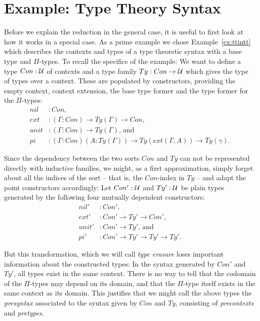 \section{Example: Type Theory Syntax}\label{sec:red-ex}

Before we explain the reduction in the general case, it is useful to first
look at how it works in a special case.
As a prime example we chose Example~\ref{ex:ttintt} which describes
the contexts and types of a type theoretic syntax with a base type and $\Pi$-types.
To recall the specifics of the example: We want to define a type
$Con : \mathcal{U}$ of contexts and a type family $Ty : Con \to \mathcal{U}$ which gives the
type of types over a context.
These are populated by constructors, providing the empty context,
context extension, the base type former and the type former for the $\Pi$-types:
\begin{align*}
nil &: Con \text{,} \\
ext &: (\Gamma : Con) \to Ty(\Gamma) \to Con \text{,} \\
unit &: (\Gamma : Con) \to Ty(\Gamma) \text{, and} \\
pi &: (\Gamma : Con) (A : Ty(\Gamma)) \to Ty(ext(\Gamma, A)) \to Ty(\gamma) \text{.}
\end{align*}

Since the dependency between the two sorts $Con$ and $Ty$ can not be represented
directly with inductive families, we might, as a first approximation, simply forget
about all the indices of the sort -- that is, the $Con$-index in $Ty$ --
and adapt the point constructors accordingly:
Let $Con' : \mathcal{U}$ and $Ty' : \mathcal{U}$ be plain types generated by the following four
mutually dependent constructors:
\begin{align*}
nil' &: Con' \text{,} \\
ext' &: Con' \to Ty' \to Con' \text{,} \\
unit' &: Con' \to Ty' \text{, and} \\
pi' &: Con' \to Ty' \to Ty' \to Ty' \text{.}
\end{align*}

But this transformation, which we will call \emph{type erasure} loses important
information about the constructed types:
In the syntax generated by $Con'$ and $Ty'$, all types exist in the same context.
There is no way to tell that the codomain of the $\Pi$-types may depend on its domain,
and that the $\Pi$-type itself exists in the same context as its domain.
This justifies that we might call the above types the \emph{presyntax} associated
to the syntax given by $Con$ and $Ty$, consisting of \emph{precontexts} and
\emph{pretypes}.

